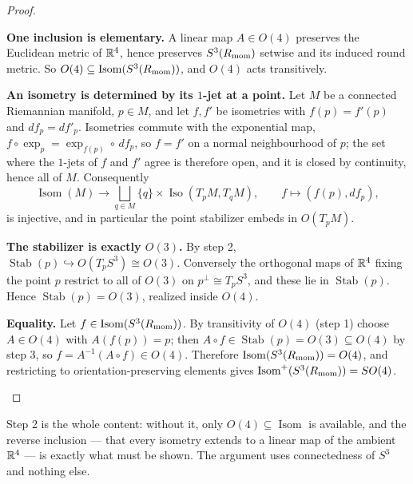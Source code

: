 \documentclass[11pt]{article}
\begin{document}
\begin{proof}
\begin{proofsteps}
\item \textbf{One inclusion is elementary.}
A linear map \(A\in O(4)\) preserves the Euclidean metric of \(\mathbb{R}^4\), hence
preserves \(S^3(R_{\mathrm{mom}})\) setwise and its induced round metric.  So
\(O(4)\subseteq\operatorname{Isom}(S^3(R_{\mathrm{mom}}))\), and \(O(4)\) acts
transitively.

\item \textbf{An isometry is determined by its \(1\)-jet at a point.}
Let \(M\) be a connected Riemannian manifold, \(p\in M\), and let \(f,f'\) be
isometries with \(f(p)=f'(p)\) and \(df_p=df'_p\).  Isometries commute with the
exponential map, \(f\circ\exp_p=\exp_{f(p)}\circ\,df_p\), so \(f=f'\) on a
normal neighbourhood of \(p\); the set where the \(1\)-jets of \(f\) and \(f'\)
agree is therefore open, and it is closed by continuity, hence all of \(M\).
Consequently
\[
  \operatorname{Isom}(M)\longrightarrow
  \bigsqcup_{q\in M}\{q\}\times
  \operatorname{Iso}(T_pM,T_qM),
  \qquad
  f\longmapsto (f(p),df_p),
\]
is injective, and in particular the point stabilizer embeds in \(O(T_pM)\).

\item \textbf{The stabilizer is exactly \(O(3)\).}
By step 2, \(\operatorname{Stab}(p)\hookrightarrow O(T_pS^3)\cong O(3)\).
Conversely the orthogonal maps of \(\mathbb{R}^4\) fixing the point \(p\) restrict
to all of \(O(3)\) on \(p^{\perp}\cong T_pS^3\), and these lie in
\(\operatorname{Stab}(p)\).  Hence \(\operatorname{Stab}(p)=O(3)\), realized
inside \(O(4)\).

\item \textbf{Equality.}
Let \(f\in\operatorname{Isom}(S^3(R_{\mathrm{mom}}))\).  By transitivity of \(O(4)\)
(step 1) choose \(A\in O(4)\) with \(A(f(p))=p\); then
\(A\circ f\in\operatorname{Stab}(p)=O(3)\subseteq O(4)\) by step 3, so
\(f=A^{-1}(A\circ f)\in O(4)\).  Therefore
\(\operatorname{Isom}(S^3(R_{\mathrm{mom}}))=O(4)\), and restricting to
orientation-preserving elements gives
\(\operatorname{Isom}^+(S^3(R_{\mathrm{mom}}))=SO(4)\).
\end{proofsteps}
\end{proof}

\begin{remark}
Step 2 is the whole content: without it, only \(O(4)\subseteq\operatorname{Isom}\)
is available, and the reverse inclusion --- that every isometry extends to a
linear map of the ambient \(\mathbb{R}^4\) --- is exactly what must be shown.  The
argument uses connectedness of \(S^3\) and nothing else.
\end{remark}
\end{document}
